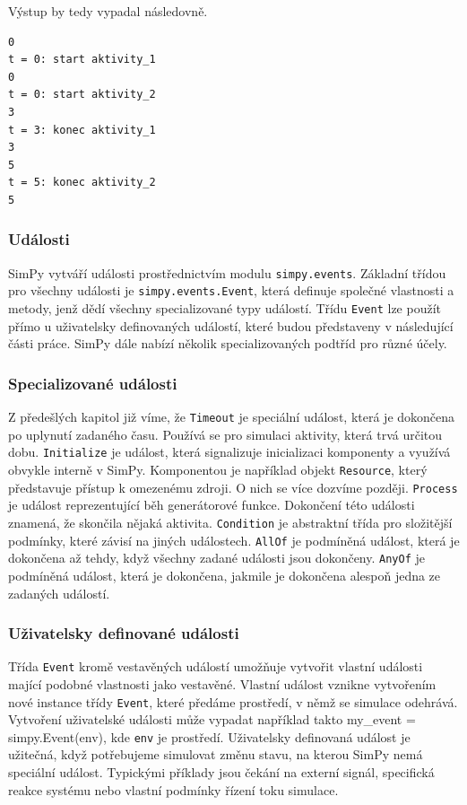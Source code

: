 \documentclass[12pt,a4paper]{article}
\begin{document}
\noindent Výstup by tedy vypadal následovně.

 \begin{verbatim} 
0
t = 0: start aktivity_1
0
t = 0: start aktivity_2
3
t = 3: konec aktivity_1
3
5
t = 5: konec aktivity_2
5
\end{verbatim}


\subsubsection{Události}
SimPy vytváří události prostřednictvím modulu \texttt{simpy.events}. Základní třídou pro všechny události je \texttt{simpy.events.Event}, která definuje společné vlastnosti a metody, jenž dědí všechny specializované typy událostí. Třídu \texttt{Event} lze použít přímo u uživatelsky definovaných událostí, které budou představeny v následující části práce. SimPy dále nabízí několik specializovaných podtříd pro různé účely.

\subsubsection{Specializované události}

Z předešlých kapitol již víme, že \texttt{Timeout} je speciální událost, která je dokončena po uplynutí zadaného času. Používá se pro simulaci aktivity, která trvá určitou dobu.
 \texttt{Initialize} je událost, která signalizuje inicializaci komponenty a využívá obvykle interně v SimPy. Komponentou je například objekt \texttt{Resource}, který představuje přístup k omezenému zdroji. O nich se více dozvíme později. \texttt{Process} je událost reprezentující běh generátorové funkce. Dokončení této události znamená, že skončila nějaká aktivita. \texttt{Condition} je abstraktní třída pro složitější podmínky, které závisí na jiných událostech. \texttt{AllOf} je podmíněná událost, která je dokončena až tehdy, když všechny zadané události jsou dokončeny. \texttt{AnyOf} je podmíněná událost, která je dokončena, jakmile je dokončena alespoň jedna ze zadaných událostí.

\subsubsection{Uživatelsky definované události}

Třída \texttt{Event} kromě vestavěných událostí umožňuje vytvořit vlastní události mající podobné vlastnosti jako vestavěné. Vlastní událost vznikne vytvořením nové instance třídy \texttt{Event}, které předáme prostředí, v němž se simulace odehrává. Vytvoření uživatelské události může vypadat například takto {my\_event = simpy.Event(env)}, kde \texttt{env} je prostředí. Uživatelsky definovaná událost je užitečná, když potřebujeme simulovat změnu stavu, na kterou SimPy nemá speciální událost. Typickými příklady jsou čekání na externí signál, specifická reakce systému nebo vlastní podmínky řízení toku simulace.
\end{document}
